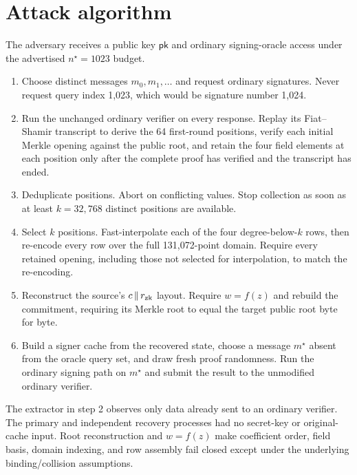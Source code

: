\documentclass[10pt,a4paper]{article}
\begin{document}
\section{Attack algorithm}
\label{sec:algorithm}

The adversary receives a public key $\mathsf{pk}$ and ordinary signing-oracle
access under the advertised $n^\star=1023$ budget.

\begin{enumerate}
  \item Choose distinct messages $m_0,m_1,\ldots$ and request ordinary
        signatures. Never request query index 1,023, which would be signature
        number 1,024.
  \item Run the unchanged ordinary verifier on every response. Replay its
        Fiat--Shamir transcript to derive the 64 first-round positions, verify
        each initial Merkle opening against the public root, and retain the
        four field elements at each position only after the complete proof has
        verified and the transcript has ended.
  \item Deduplicate positions. Abort on conflicting values. Stop collection
        as soon as at least $k=32{,}768$ distinct positions are available.
  \item Select $k$ positions. Fast-interpolate each of the four
        degree-below-$k$ rows, then re-encode every row over the full
        131,072-point domain. Require every retained opening, including those
        not selected for interpolation, to match the re-encoding.
  \item Reconstruct the source's $c\,\|\,r_{\rm zk}$ layout. Require
        $w=f(z)$ and rebuild the commitment, requiring its Merkle root to equal
        the target public root byte for byte.
  \item Build a signer cache from the recovered state, choose a message
        $m^\star$ absent from the oracle query set, and draw fresh proof
        randomness. Run the ordinary signing path on $m^\star$ and submit the
        result to the unmodified ordinary verifier.
\end{enumerate}

The extractor in step 2 observes only data already sent to an ordinary
verifier. The primary and independent recovery processes had no secret-key or
original-cache input. Root reconstruction and $w=f(z)$ make coefficient order,
field basis, domain indexing, and row assembly fail closed except under the
underlying binding/collision assumptions.
\end{document}

